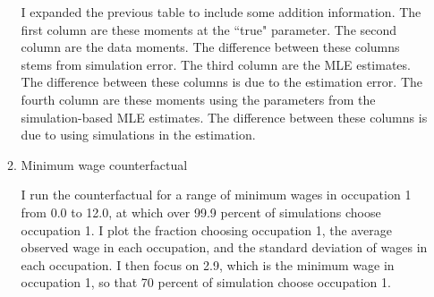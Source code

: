 \documentclass{article}
\begin{document}
\begin{enumerate}
\begin{enumerate}
\bigskip

\begin{center}
\end{center}

\bigskip

I expanded the previous table to include some addition information.  The first column are these moments at the ``true" parameter.  The second column are the data moments. The difference between these columns stems from simulation error.  The third column are the MLE estimates.  The difference between these columns is due to the estimation error.  The fourth column are these moments using the parameters from the simulation-based MLE estimates.  The difference between these columns is due to using simulations in the estimation.

\bigskip

\begin{center}
\end{center}

\bigskip

\item Minimum wage counterfactual

\bigskip

I run the counterfactual for a range of minimum wages in occupation 1 from 0.0 to 12.0, at which over 99.9 percent of simulations choose occupation 1.  I plot the fraction choosing occupation 1, the average observed wage in each occupation, and the standard deviation of wages in each occupation.  I then focus on 2.9, which is the minimum wage in occupation 1, so that 70 percent of simulation choose occupation 1.


\end{enumerate}
\end{enumerate}
\end{document}
